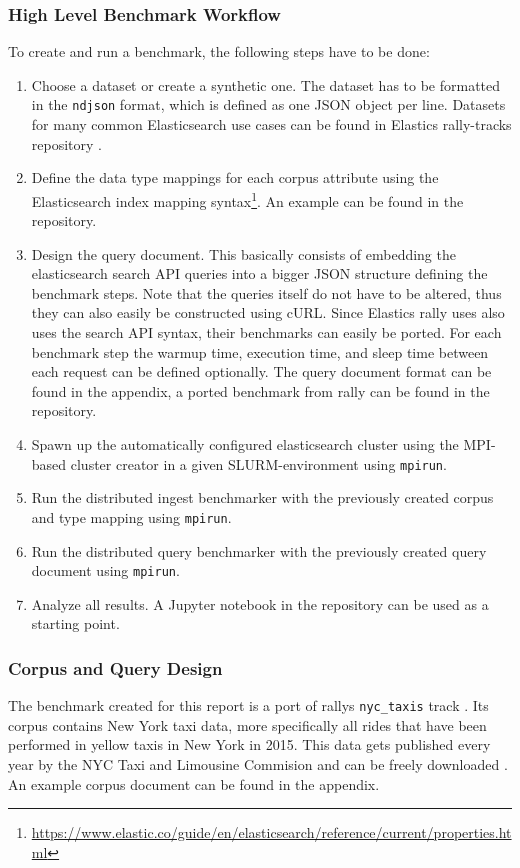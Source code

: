 \subsubsection{High Level Benchmark Workflow}
To create and run a benchmark, the following steps have to be done:
\begin{enumerate}
  \item Choose a dataset or create a synthetic one. The dataset has to be formatted in the \texttt{ndjson} format, which is defined as one JSON object per line. Datasets for many common Elasticsearch use cases can be found in Elastics rally-tracks repository \cite{rallytracks}.
  \item Define the data type mappings for each corpus attribute using the Elasticsearch index mapping syntax\footnote{\url{https://www.elastic.co/guide/en/elasticsearch/reference/current/properties.html}}. An example can be found in the repository.
  \item Design the query document. This basically consists of embedding the elasticsearch search API queries into a bigger JSON structure defining the benchmark steps.  Note that the queries itself do not have to be altered, thus they can also easily be constructed using cURL. Since Elastics rally uses also uses the search API syntax, their benchmarks can easily be ported. For each benchmark step the warmup time, execution time, and sleep time between each request can be defined optionally. The query document format can be found in the appendix, a ported benchmark from rally can be found in the repository.
  \item Spawn up the automatically configured elasticsearch cluster using the \ac{MPI}-based cluster creator in a given SLURM-environment using \texttt{mpirun}.
  \item Run the distributed ingest benchmarker with the previously created corpus and type mapping using \texttt{mpirun}.
  \item Run the distributed query benchmarker with the previously created query document using \texttt{mpirun}.
  \item Analyze all results. A Jupyter notebook in the repository can be used as a starting point.
\end{enumerate}

\subsubsection{Corpus and Query Design}
The benchmark created for this report is a port of rallys \texttt{nyc\_taxis} track \cite{nyctaxis}. Its corpus contains New York taxi data, more specifically all rides that have been performed in yellow taxis in New York in 2015. This data gets published every year by the NYC Taxi and Limousine Commision and can be freely downloaded \cite{tlcdata}. An example corpus document can be found in the appendix.\\

